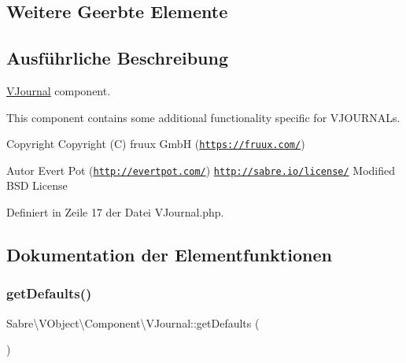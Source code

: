 \subsection*{Weitere Geerbte Elemente}


\subsection{Ausführliche Beschreibung}
\mbox{\hyperlink{class_sabre_1_1_v_object_1_1_component_1_1_v_journal}{V\+Journal}} component.

This component contains some additional functionality specific for V\+J\+O\+U\+R\+N\+A\+Ls.

\begin{DoxyCopyright}{Copyright}
Copyright (C) fruux GmbH (\href{https://fruux.com/}{\tt https\+://fruux.\+com/}) 
\end{DoxyCopyright}
\begin{DoxyAuthor}{Autor}
Evert Pot (\href{http://evertpot.com/}{\tt http\+://evertpot.\+com/})  \href{http://sabre.io/license/}{\tt http\+://sabre.\+io/license/} Modified B\+SD License 
\end{DoxyAuthor}


Definiert in Zeile 17 der Datei V\+Journal.\+php.



\subsection{Dokumentation der Elementfunktionen}
\mbox{\label{class_sabre_1_1_v_object_1_1_component_1_1_v_journal_ac481d886ffa080ec747dda96d274bff5}} 
\subsubsection{\texorpdfstring{get\+Defaults()}{getDefaults()}}
{\footnotesize\ttfamily Sabre\textbackslash{}\+V\+Object\textbackslash{}\+Component\textbackslash{}\+V\+Journal\+::get\+Defaults (\begin{DoxyParamCaption}{ }\end{DoxyParamCaption})\hspace{0.3cm}{\ttfamily [protected]}}

